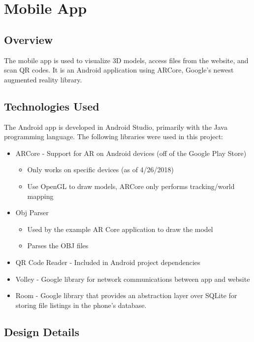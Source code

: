 
\section{Mobile App}

    \subsection{Overview}
The mobile app is used to visualize 3D models, access files from the website, and scan QR codes. It is an Android application using ARCore, Google's newest augmented reality library.
    \subsection{Technologies Used}
The Android app is developed in Android Studio, primarily with the Java programming language. The following libraries were used in this project:
    \begin{itemize}
        \item ARCore - Support for AR on Android devices (off of the Google Play Store)
        \begin{itemize}
            \item Only works on specific devices (as of 4/26/2018)
            \item Use OpenGL to draw models, ARCore only performs tracking/world mapping
        \end{itemize}
        \item Obj Parser
        \begin{itemize}
            \item Used by the example AR Core application to draw the model
            \item Parses the OBJ files
        \end{itemize}
        \item QR Code Reader - Included in Android project dependencies
        \item Volley - Google library for network communications between app and website
        \item Room - Google library that provides an abstraction layer over SQLite for storing file listings in the phone's database.
    \end{itemize}

    \subsection{Design Details}
    
